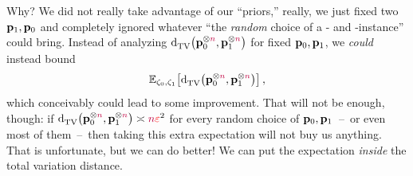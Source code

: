 Why? We did not really take advantage of our ``priors,'' really, we just fixed two $\mathbf{p}_1,\mathbf{p}_0$ and completely ignored whatever ``the \emph{random} choice of a \yes- and \no-instance'' could bring. Instead of analyzing $\totalvardist{\p_0^{\otimes\ns}}{\p_1^{\otimes\ns}}$ for fixed $\mathbf{p}_0,\mathbf{p}_1$, we \emph{could} instead bound
\begin{equation}
	\label{eq:mixture:distances}
	\bE{\zeta_\reject,\zeta_\accept}{\totalvardist{\p_0^{\otimes\ns}}{\p_1^{\otimes\ns}}}\,,
\end{equation}
which conceivably could lead to some improvement. That will not be enough, though: if $\totalvardist{\p_0^{\otimes\ns}}{\p_1^{\otimes\ns}}\asymp \ns\dst^2$ for every random choice of $\mathbf{p}_0,\mathbf{p}_1$~--~or even most of them~--~then taking this extra expectation will not buy us anything. That is unfortunate, but we can do better! We can put the expectation \emph{inside} the total variation distance.

